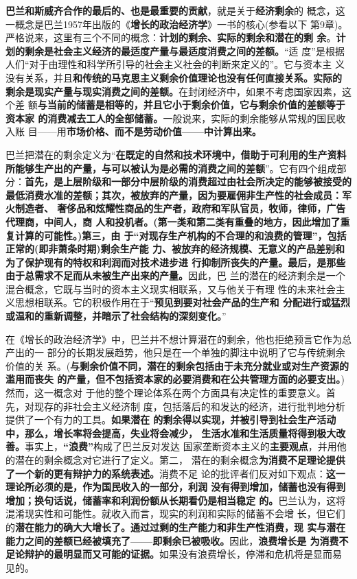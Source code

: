 \textbf{巴兰和斯威齐合作的最后的、也是最重要的贡献}，就是关于\textbf{经济剩余}的
概念，这一概念是巴兰1957年出版的《\textbf{增长的政治经济学}》一书的核心(参看以下
第9章)。严格说来，这里有三个不同的概念：\textbf{计划的剩余、实际的剩余和潜在的剩
  余}。\textbf{计划的剩余是社会主义经济的最适度产量与最适度消费之间的差额。}“适
度”是根据人们“对于由理性和科学所引导的社会主义社会的判断来定义的”。它与资本主
义没有关系，并且\textbf{和传统的马克思主义剩余价值理论也没有任何直接关系。实际的
  剩余是现实产量与现实消费之间的差额。}在封闭经济中，如果不考虑国家因素，这个差
额\textbf{与当前的储蓄是相等的，并且它小于剩余价值，它与剩余价值的差额等于资本家
  的消费减去工人的全部储蓄。}一般说来，实际的剩余能够从常规的国民收入账
目——用\textbf{市场价格、而不是劳动价值——中计算出来。}


巴兰把潜在的剩余定义为“\textbf{在既定的自然和技术环境中，借助于可利用的生产资料
  所能够生产出的产量，与可以被认为是必需的消费之间的差额}”。它有四个组成部
分：\textbf{首先，是上层阶级和一部分中层阶级的消费超过由社会所决定的能够被接受的
  最低消费水准的差额；其次，被放弃的产量，因为要雇佣非生产性的社会成员：军火制造者、
  奢侈品和炫耀性商品的生产者，政府和军队官员，牧师，律师，广告代理商，中间人，商
  人和投机者。(第一类和第二类有重叠的地方，因此增加了重复计算的可能性。)第三，由
  于“对现存生产机构的不合理的和浪费的管理”，包括正常的(即非萧条时期)剩余生产能
  力、被放弃的经济规模、无意义的产品差别和为了保护现有的特权和利润而对技术进步进
  行抑制所丧失的产量。最后，是那些由于总需求不足而从未被生产出来的产量。}因此，巴
兰的潜在的经济剩余是一个混合概念，它既与当时的资本主义现实相联系，又与他关于有理
性的未来社会主义思想相联系。它的积极作用在于“\textbf{预见到要对社会产品的生产和
  分配进行或猛烈或温和的重新调整，并暗示了社会结构的深刻变化。}”

在《增长的政治经济学》中，巴兰并不想计算潜在的剩余，他也拒绝预言它作为总产出的一
部分的长期发展趋势，他只是在一个单独的脚注中说明了它与传统剩余价值的关
系。(\textbf{与剩余价值不同，潜在的剩余包括由于未充分就业或对生产资源的滥用而丧失
  的产量，但不包括资本家的必要消费和在公共管理方面的必要支出。})然而，这一概念对
于他的整个理论体系在两个方面具有决定性的重要意义。首先，对现存的非社会主义经济制
度，包括落后的和发达的经济，进行批判地分析提供了一个有力的工具。\textbf{如果潜在
  的剩余得以实现，并被引导到社会生产活动中，那么，增长率将会提高，失业将会减少，
  生活水准和生活质量将得到极大改善。}事实上，\textbf{“浪费”}构成了巴兰反对发达
国家垄断资本主义的\textbf{主要观点}，并用他的潜在的剩余概念对它进行了定义。第二，
潜在的剩余概念\textbf{为消费不足理论提供了一个新的更有辩护力的系统表述。}消费不足
论的批评者们反对如下观点：\textbf{这一理论所必须的是，作为国民收入的一部分，利润
  没有得到增加，储蓄也没有得到增加；换句话说，储蓄率和利润份额从长期看仍是相当稳定
  的。}巴兰认为，这将混淆现实性和可能性。就收入而言，现实的利润和实际的储蓄不会增
长，但它们的\textbf{潜在能力的确大大增长了。通过过剩的生产能力和非生产性消费，现
  实与潜在能力之间的差额已经被填充了——即剩余已被吸收。}因此，\textbf{浪费增长是
  为消费不足论辩护的最明显而又可能的证据。}如果没有浪费增长，停滞和危机将是显而易
见的。

